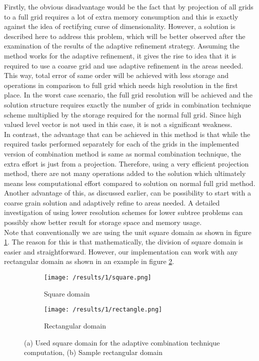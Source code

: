 Firstly, the obvious disadvantage would be the fact that by projection of all grids to a full grid requires a lot of extra memory consumption and this is exactly against the idea of rectifying curse of dimensionality. However, a solution is described here to address this problem, which will be better observed after the examination of the results of the adaptive refinement strategy. Assuming the method works for the adaptive refinement, it gives the rise to idea that it is required to use a coarse grid and use adaptive refinement in the areas needed. This way, total error of same order will be achieved with less storage and operations in comparison to full grid which needs high resolution in the first place. In the worst case scenario, the full grid resolution will be achieved and the solution structure requires exactly the number of grids in combination technique scheme multiplied by the storage required for the normal full grid. Since high valued level vector is not used in this case, it is not a significant weakness.\\

In contrast, the advantage that can be achieved in this method is that while the required tasks performed separately for each of the grids in the implemented version of combination method is same as normal combination technique, the extra effort is just from a projection. Therefore, using a very efficient projection method, there are not many operations added to the solution which ultimately means less computational effort compared to solution on normal full grid method. Another advantage of this, as discussed earlier, can be possibility to start with a coarse grain solution and adaptively refine to areas needed. A detailed investigation of using lower resolution schemes for lower subtree problems can possibly show better result for storage space and memory usage. \\

Note that conventionally we are using the unit square domain as shown in figure \ref{fig:results1Square}. The reason for this is that mathematically, the division of square domain is easier and straightforward. However, our implementation can work with any rectangular domain as shown in an example in figure \ref{fig:results1Rect}. 

\begin{figure}[h]
	\centering
    \begin{subfigure}[b]{0.49\textwidth}    
	    \texttt{[image: /results/1/square.png]}
		\centering    
	 \caption{Square domain}
	 \label{fig:results1Square}
    \end{subfigure} 
    \begin{subfigure}[b]{0.49\textwidth}
	    \texttt{[image: /results/1/rectangle.png]}
		\centering
        \caption{Rectangular domain}
        \label{fig:results1Rect}
    \end{subfigure}     
    \caption{(a) Used square domain for the adaptive combination technique computation, (b) Sample rectangular domain}
    \label{fig:results1SquareRect}
\end{figure}

